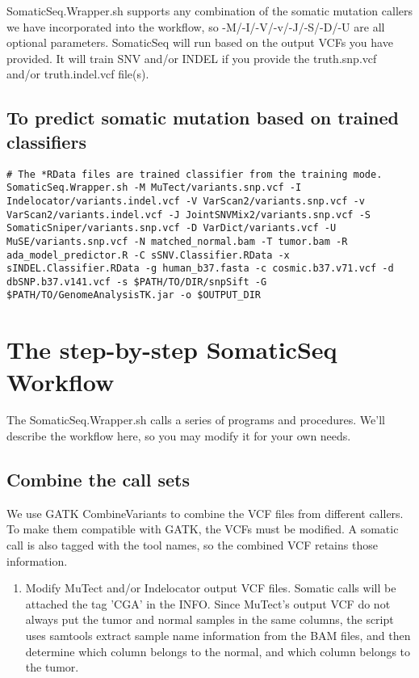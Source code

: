 \documentclass[10pt,letterpaper]{article}
\begin{document}
\begin{sloppypar}
SomaticSeq.Wrapper.sh supports any combination of the somatic mutation callers we have incorporated into the workflow, so -M/-I/-V/-v/-J/-S/-D/-U are all optional parameters. SomaticSeq will run based on the output VCFs you have provided. It will train SNV and/or INDEL if you provide the truth.snp.vcf and/or truth.indel.vcf file(s).




\subsection{To predict somatic mutation based on trained classifiers}

\begin{lstlisting}
# The *RData files are trained classifier from the training mode.
SomaticSeq.Wrapper.sh -M MuTect/variants.snp.vcf -I Indelocator/variants.indel.vcf -V VarScan2/variants.snp.vcf -v VarScan2/variants.indel.vcf -J JointSNVMix2/variants.snp.vcf -S SomaticSniper/variants.snp.vcf -D VarDict/variants.vcf -U MuSE/variants.snp.vcf -N matched_normal.bam -T tumor.bam -R ada_model_predictor.R -C sSNV.Classifier.RData -x sINDEL.Classifier.RData -g human_b37.fasta -c cosmic.b37.v71.vcf -d dbSNP.b37.v141.vcf -s $PATH/TO/DIR/snpSift -G $PATH/TO/GenomeAnalysisTK.jar -o $OUTPUT_DIR
\end{lstlisting}



\section{The step-by-step SomaticSeq Workflow}

The SomaticSeq.Wrapper.sh calls a series of programs and procedures. We'll describe the workflow here, so you may modify it for your own needs. 


	\subsection{Combine the call sets}
	We use GATK CombineVariants to combine the VCF files from different callers. To make them compatible with GATK, the VCFs must be modified. A somatic call is also tagged with the tool names, so the combined VCF retains those information. 

	\begin{enumerate}

	\item 
	Modify MuTect and/or Indelocator output VCF files. Somatic calls will be attached the tag 'CGA' in the INFO. 
	Since MuTect's output VCF do not always put the tumor and normal samples in the same columns, the script uses samtools extract sample name information from the BAM files, and then determine which column belongs to the normal, and which column belongs to the tumor. 
	

\end{enumerate}
\end{sloppypar}
\end{document}
